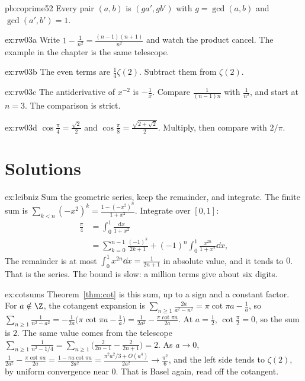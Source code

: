 \begin{hint}{pb:coprime52}
Every pair $(a,b)$ is $(ga',gb')$ with $g=\gcd(a,b)$ and $\gcd(a',b')=1$.
\end{hint}
\begin{hint}{ex:rw03a}
Write $1-\frac1{n^2}=\frac{(n-1)(n+1)}{n^2}$ and watch the product cancel. The example in the chapter is the same telescope.
\end{hint}
\begin{hint}{ex:rw03b}
The even terms are $\frac1{4}\zeta(2)$. Subtract them from $\zeta(2)$.
\end{hint}
\begin{hint}{ex:rw03c}
The antiderivative of $x^{-2}$ is $-\frac1x$. Compare $\frac1{(n-1)n}$ with $\frac1{n^2}$, and start at $n=3$. The comparison is strict.
\end{hint}
\begin{hint}{ex:rw03d}
$\cos\frac\pi4=\frac{\sqrt2}2$ and $\cos\frac\pi8=\frac{\sqrt{2+\sqrt2}}2$. Multiply, then compare with $2/\pi$.
\end{hint}

\section{Solutions}

\begin{solution}{ex:leibniz}
\idea Sum the geometric series, keep the remainder, and integrate.
\writeup The finite sum is $\sum_{k<n}(-x^2)^k=\frac{1-(-x^2)^n}{1+x^2}$. Integrate over $[0,1]$:
\[
\begin{aligned}\frac\pi4&=\int_0^1\frac{\mathrm dx}{1+x^2}\\&=\sum_{k=0}^{n-1}\frac{(-1)^k}{2k+1}+(-1)^n\int_0^1\frac{x^{2n}}{1+x^2}\dd x,\end{aligned}
\]
The remainder is at most $\int_0^1x^{2n}\dd x=\frac1{2n+1}$ in absolute value, and it tends to $0$. That is the series. The bound is slow: a million terms give about six digits.
\end{solution}

\begin{solution}{ex:cotsums}
\idea Theorem~\ref{thm:cot} is this sum, up to a sign and a constant factor.
\writeup For $a\notin\Z$, the cotangent expansion is $\sum_{n\ge1}\frac{2a}{a^2-n^2}=\pi\cot\pi a-\frac1a$, so
$\sum_{n\ge1}\frac1{n^2-a^2}=-\frac1{2a}\bigl(\pi\cot\pi a-\frac1a\bigr)=\frac1{2a^2}-\frac{\pi\cot\pi a}{2a}$. At $a=\frac12$, $\cot\frac\pi2=0$, so the sum is
$2$. The same value comes from the telescope $\sum_{n\ge1}\frac1{n^2-1/4}=\sum_{n\ge1}\bigl(\frac2{2n-1}-\frac2{2n+1}\bigr)=2$. As $a\to0$,
$\frac1{2a^2}-\frac{\pi\cot\pi a}{2a}=\frac{1-\pi a\cot\pi a}{2a^2}=\frac{\pi^2a^2/3+O(a^4)}{2a^2}\to\frac{\pi^2}6$, and the left side tends to
$\zeta(2)$, by uniform convergence near $0$. That is Basel again, read off the cotangent.
\end{solution}

